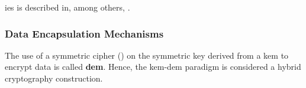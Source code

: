 
\gls{ies} is described in, among others, \cite{rfc5903,ansi_ies_2011,ieee_ies_2004}.


\subsubsection{Data Encapsulation Mechanisms}\label{sec:hybrid_cryptography:ciphers:kem_dem}

The use of a symmetric cipher () on the symmetric key derived from a \gls{kem} to encrypt data is called \textbf{\gls{dem}}. Hence, the \gls{kem}-\gls{dem} paradigm is considered a hybrid cryptography construction.

